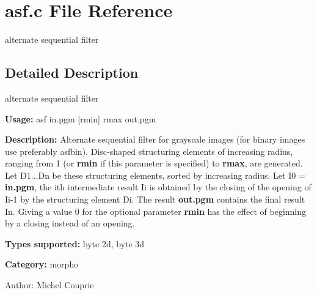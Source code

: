 \section{asf.c File Reference}
\label{asf_8c}
alternate sequential filter 



\subsection{Detailed Description}
alternate sequential filter 

{\bf Usage:} asf in.pgm [rmin] rmax out.pgm

{\bf Description:} Alternate sequential filter for grayscale images (for binary images use preferably asfbin). Disc-shaped structuring elements of increasing radius, ranging from 1 (or {\bf rmin} if this parameter is specified) to {\bf rmax}, are generated. Let D1...Dn be these structuring elements, sorted by increasing radius. Let I0 = {\bf in.pgm}, the ith intermediate result Ii is obtained by the closing of the opening of Ii-1 by the structuring element Di. The result {\bf out.pgm} contains the final result In. Giving a value 0 for the optional parameter {\bf rmin} has the effect of beginning by a closing instead of an opening.

{\bf Types supported:} byte 2d, byte 3d

{\bf Category:} morpho

\begin{Desc}
\item[Author:]Michel Couprie \end{Desc}
